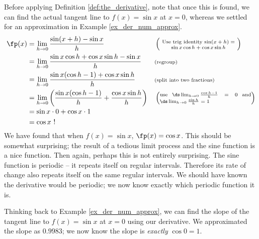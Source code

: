 {Before applying Definition \ref{def:the_derivative}, note that once this is found, we can find the actual tangent line to $f(x) = \sin x$ at $x=0$, whereas we settled for an approximation in Example \ref{ex_der_num_approx}. 
		\small
		\begin{align*}
		\fp(x) &= \lim_{h\to 0} \frac{\sin(x+h)-\sin x}{h} & & \left(\text{\scriptsize \parbox{110pt}{\centering Use trig identity $\sin(x+h) = \sin x\cos h+\cos x\sin h$}}\right) \\
						&= \lim_{h\to 0} \frac{\sin x\cos h+\cos x\sin h-\sin x}{h} & & \text{\scriptsize (regroup)}\\
						&= \lim_{h\to 0} \frac{\sin x(\cos h-1) + \cos x\sin h}{h} & & \text{\scriptsize (split into two fractions)}\\
						&= \lim_{h\to 0} \left(\frac{\sin x(\cos h-1)}{h} + \frac{\cos x\sin h}{h}\right) & & \left(\parbox{130pt}{\scriptsize use $\ds \lim_{h\to 0} \frac{\cos h-1}{h} = 0$ and $\ds \lim_{h\to 0} \frac{\sin h}{h} = 1$}\right)\\
						&=	\sin x\cdot 0 + \cos x \cdot 1 \\
						&= \cos x\ !
		\end{align*}
		\normalsize
We have found that when $f(x) = \sin x$, $\fp(x) = \cos x$. This should be somewhat surprising; the result of a tedious limit process and the sine function is a nice function. Then again, perhaps this is not entirely surprising. The sine function is periodic -- it repeats itself on regular intervals. Therefore its rate of change also repeats itself on the same regular intervals. We should have known the derivative would be periodic; we now know exactly which periodic function it is.

Thinking back to Example \ref{ex_der_num_approx}, we can find the slope of the tangent line to $f(x)=\sin x$ at $x=0$ using our derivative. We approximated the slope as $0.9983$; we now know the slope is \textit{exactly} $\cos 0 =1$. 
}\\

